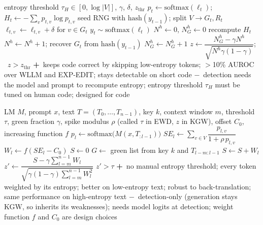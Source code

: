 \documentclass[10pt,a4paper,twocolumn]{article}
\newcommand{\pro}[1]{\Statex\textcolor{proc}{\textbf{+}\ #1}}
\newcommand{\con}[1]{\Statex\textcolor{conc}{\textbf{$-$}\ #1}}
\begin{document}
\begin{algorithm}[H]\small
\caption{SWEET (Lee et al.\ 2023)}
\begin{algorithmic}[1]
\Require entropy threshold $\tau_H\in[0,\log|V|]$, $\gamma$, $\delta$, $z_{\mathrm{thr}}$
  \State $p_t\gets\mathrm{softmax}(\ell_t)$; \ $H_t\gets-\sum_vp_{t,v}\log p_{t,v}$
   \State seed RNG with $\mathrm{hash}(y_{t-1})$; split $V\to G_t,R_t$
   \State $\ell_{t,v}\gets\ell_{t,v}+\delta$ for $v\in G_t$
  \EndIf
  \State $y_t\sim\mathrm{softmax}(\ell_t)$
 \EndFor
\EndProcedure
{}
 \State $N^h\gets0$, $N^h_G\gets0$
  \State recompute $H_t$ 
   \State $N^h\gets N^h+1$; recover $G_t$ from $\mathrm{hash}(y_{t-1})$
    \State $N^h_G\gets N^h_G+1$ \EndIf
  \EndIf
 \EndFor
 \State $z\gets\dfrac{N^h_G-\gamma N^h}{\sqrt{N^h\gamma(1-\gamma)}}$; \ \Return $z>z_{\mathrm{thr}}$
\EndProcedure
\pro{keeps code correct by skipping low-entropy tokens; $>$10\% AUROC over WLLM and EXP-EDIT; stays detectable on short code}
\con{detection needs the model and prompt to recompute entropy; entropy threshold $\tau_H$ must be tuned on human code; designed for code}
\end{algorithmic}
\end{algorithm}

\begin{algorithm}[H]\small
\caption{EWD detection (Lu et al.\ 2024; generation = KGW)}
\begin{algorithmic}[1]
\Require LM $M$, prompt $x$, text $T=(T_0,\dots,T_{n-1})$, key $k$, context window $m$, threshold $\tau$, green fraction $\gamma$, spike modulus $\rho$ (called $\tau$ in EWD, $z$ in KGW), offset $C_0$, increasing function $f$
 \State $p_l\gets\mathrm{softmax}\big(M(x,T_{:l-1})\big)$ 
 \State $SE_l\gets\sum_{v\in V}\dfrac{p_{l,v}}{1+\rho\,p_{l,v}}$ 
 \State $W_l\gets f(SE_l-C_0)$ 
\EndFor
\State $S\gets0$ 
 \State $G\gets$ green list from key $k$ and $T_{l-m:l-1}$ 
  \State $S\gets S+W_l$ \EndIf
\EndFor
\State $z'\gets\dfrac{S-\gamma\sum_{l=m}^{n-1}W_l}{\sqrt{\gamma(1-\gamma)\sum_{l=m}^{n-1}W_l^2}}$
\State \Return $z'>\tau$ 
\pro{no manual entropy threshold; every token weighted by its entropy; better on low-entropy text; robust to back-translation; same performance on high-entropy text}
\con{detection-only (generation stays KGW, so inherits its weaknesses); needs model logits at detection; weight function $f$ and $C_0$ are design choices}
\end{algorithmic}
\end{algorithm}
\end{document}
